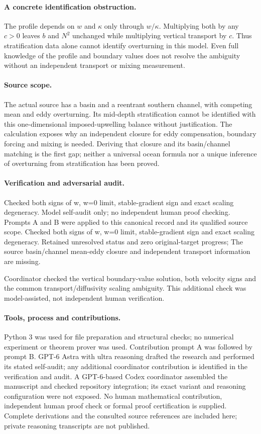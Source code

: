 \documentclass[11pt]{article}
\begin{document}
\paragraph{A concrete identification obstruction.} The profile depends on $w$ and $\kappa$ only through $w/\kappa$. Multiplying both by any $c>0$ leaves $b$ and $N^2$ unchanged while multiplying vertical transport by $c$. Thus stratification data alone cannot identify overturning in this model. Even full knowledge of the profile and boundary values does not resolve the ambiguity without an independent transport or mixing measurement.

\paragraph{Source scope.} The actual source has a basin and a reentrant southern channel, with competing mean and eddy overturning. Its mid-depth stratification cannot be identified with this one-dimensional imposed-upwelling balance without justification. The calculation exposes why an independent closure for eddy compensation, boundary forcing and mixing is needed. Deriving that closure and its basin/channel matching is the first gap; neither a universal ocean formula nor a unique inference of overturning from stratification has been proved.

\paragraph{Verification and adversarial audit.}
Checked both signs of w, w=0 limit, stable-gradient sign and exact scaling degeneracy. Model self-audit only; no independent human proof checking. Prompts A and B were applied to this canonical record and its qualified source scope. Checked both signs of w, w=0 limit, stable-gradient sign and exact scaling degeneracy. Retained unresolved status and zero original-target progress; The source basin/channel mean-eddy closure and independent transport information are missing.

Coordinator checked the vertical boundary-value solution, both velocity signs and the common transport/diffusivity scaling ambiguity. This additional check was model-assisted, not independent human verification.

\paragraph{Tools, process and contributions.}
Python 3 was used for file preparation and structural checks; no numerical experiment or theorem prover was used. Contribution prompt A was followed by prompt B. GPT-6 Astra with ultra reasoning drafted the research and performed its stated self-audit; any additional coordinator contribution is identified in the verification and audit. A GPT-6-based Codex coordinator assembled the manuscript and checked repository integration; its exact variant and reasoning configuration were not exposed. No human mathematical contribution, independent human proof check or formal proof certification is supplied. Complete derivations and the consulted source references are included here; private reasoning transcripts are not published.
\end{document}

